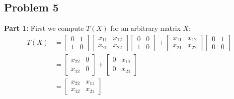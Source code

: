 \documentclass{article}
\begin{document}
\subsection*{Problem 5}
\noindent\textbf{Part 1:} First we compute $T(X)$ for an arbitrary matrix $X$:
\begin{align*}
  T(X)&=\begin{bmatrix}
    0&1\\1&0
  \end{bmatrix}\begin{bmatrix}
    x_{11}&x_{12}\\x_{21}&x_{22}
  \end{bmatrix}\begin{bmatrix}
    0&0\\1&0
  \end{bmatrix}+\begin{bmatrix}
    x_{11}&x_{12}\\x_{21}&x_{22}
  \end{bmatrix}\begin{bmatrix}
    0&1\\0&0
  \end{bmatrix}\\
  &=\begin{bmatrix}
    x_{22}&0\\x_{12}&0
  \end{bmatrix}+\begin{bmatrix}
    0&x_{11}\\0&x_{21}
  \end{bmatrix}\\
  &=\begin{bmatrix}
    x_{22}&x_{11}\\x_{12}&x_{21}
  \end{bmatrix}\\
\end{align*}
\end{document}
